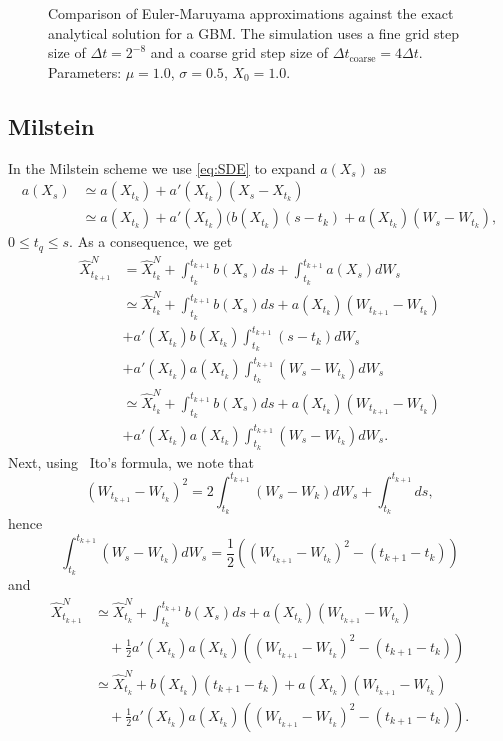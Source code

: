 \begin{figure}[H]
    \centering
    
    \caption{Comparison of Euler-Maruyama approximations against the exact analytical solution for a GBM. The simulation uses a fine grid step size of $\Delta t = 2^{-8}$ and a coarse grid step size of $\Delta t_{\text{coarse}} = 4\Delta t$. Parameters: $\mu=1.0$, $\sigma=0.5$, $X_0=1.0$.}
    \label{fig:eulerMaruyamaCoarseFineComparison}
\end{figure}

\clearpage
\subsection{Milstein}
In the Milstein scheme we use \cref{eq:SDE} to expand $a(X_s)$ as
\begin{align*}
    a(X_s) &\simeq a(X_{t_k}) + a'(X_{t_k}) (X_s - X_{t_k}) \\
    &\simeq a(X_{t_k}) + a'(X_{t_k})(b(X_{t_k}) (s-t_k) + a(X_{t_k}) (W_s - W_{t_k}),
\end{align*}
$0 \leq t_q \leq s$. As a consequence, we get
\begin{align*}
    \hat{X}_{t_{k+1}}^N &= \hat{X}_{t_k}^N + \int_{t_k}^{t_{k+1}} b(X_s) ds + \int_{t_k}^{t_{k+1}} a(X_s) dW_s \\
    &\simeq \hat{X}_{t_k}^N + \int_{t_k}^{t_{k+1}} b(X_s) ds + a(X_{t_k})(W_{t_{k+1}} - W_{t_k}) \\
    &+ a'(X_{t_k})b(X_{t_k}) \int_{t_k}^{t_{k+1}} (s - t_k) dW_s \\
    &+ a'(X_{t_k})a(X_{t_k}) \int_{t_k}^{t_{k+1}} (W_s - W_{t_k}) dW_s \\
    &\simeq \hat{X}_{t_k}^N + \int_{t_k}^{t_{k+1}} b(X_s) ds + a(X_{t_k})(W_{t_{k+1}} - W_{t_k}) \\
    &+ a'(X_{t_k})a(X_{t_k}) \int_{t_k}^{t_{k+1}} (W_s - W_{t_k}) dW_s.
\end{align*}
Next, using \ Ito's formula, we note that
\begin{equation*}
    (W_{t_{k+1}} - W_{t_k})^2 = 2 \int_{t_k}^{t_{k+1}} (W_s - W_k)dW_s + \int_{t_k}^{t_{k+1}} ds,
\end{equation*}
hence
\begin{equation*}
    \int_{t_k}^{t_{k+1}} (W_s - W_{t_k}) dW_s = \frac{1}{2} ((W_{t_{k+1}}-W_{t_k})^2 - (t_{k+1} - t_k))
\end{equation*}
and
\begin{align*}
    \hat{X}_{t_{k+1}}^N &\simeq \hat{X}_{t_k}^N + \int_{t_k}^{t_{k+1}} b(X_s) ds + a(X_{t_k})(W_{t_{k+1}} - W_{t_k}) \\
    &\quad + \frac{1}{2} a'(X_{t_k})a(X_{t_k})((W_{t_{k+1}} - W_{t_k})^2 - (t_{k+1} - t_k)) \\
    &\simeq \hat{X}_{t_k}^N + b(X_{t_k})(t_{k+1} - t_k) + a(X_{t_k})(W_{t_{k+1}} - W_{t_k}) \\
    &\quad + \frac{1}{2} a'(X_{t_k})a(X_{t_k})((W_{t_{k+1}} - W_{t_k})^2 - (t_{k+1} - t_k)).
\end{align*}

